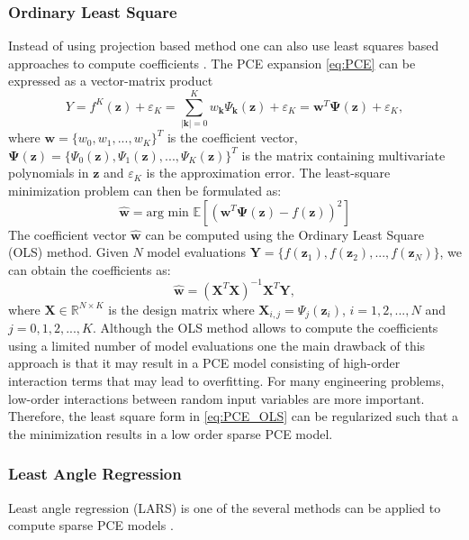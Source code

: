 \documentclass[review]{elsarticle}
\numberwithin{equation}{section}
\numberwithin{equation}{section}
\begin{document}
\subsubsection{Ordinary Least Square}
Instead of using projection based method one can also use least squares based approaches to compute coefficients \cite{Berveiller2006}. The PCE expansion \eqref{eq:PCE} can be expressed as a vector-matrix product
\begin{equation}\label{eq:LSM}
Y = f^{K}(\mathbf{z}) +\varepsilon_K = \sum_{|\mathbf{k}| = 0}^K w_{\mathbf{k}}\Psi_{\mathbf{k}}(\mathbf{z}) + \varepsilon_K = \mathbf{w}^T\boldsymbol{\Psi}(\mathbf{z}) +\varepsilon_K,
\end{equation} 
where $\mathbf{w} = \{w_0,w_1,...,w_K\}^T$ is the coefficient vector, $\boldsymbol{\Psi}(\mathbf{z}) = \{\Psi_0(\mathbf{z}), \Psi_1(\mathbf{z}), ..., \Psi_K(\mathbf{z})\}^T$ is the matrix containing multivariate polynomials in $\mathbf{z}$ and $\varepsilon_K$ is the approximation error. The least-square minimization problem can then be formulated as:
\begin{equation}\label{eq:PCE_OLS}
\mathbf{\hat{w}} = \text{arg min }\mathbb{E}\left[\left(\mathbf{w}^T \boldsymbol{\Psi}(\mathbf{z}) - f(\mathbf{z})\right)^2\right]
 \end{equation}
The coefficient vector $\mathbf{\hat{w}}$ can be computed using the Ordinary Least Square (OLS) method. Given $N$ model evaluations $\mathbf{Y} = \{f(\mathbf{z}_1), f(\mathbf{z}_2), ..., f(\mathbf{z}_N)\}$, we can obtain the coefficients as:
\begin{equation}\label{eq:OLS}
\hat{\mathbf{w}} = (\mathbf{X}^T\mathbf{X})^{-1}\mathbf{X}^T\mathbf{Y},
\end{equation}
where $\mathbf{X}\in \mathbb{R}^{N\times K}$ is the design matrix where $\mathbf{X}_{i,j} = \Psi_{j}(\mathbf{z}_i)$, $i = 1,2, ..., N$ and $j = 0,1,2,..., K$. Although the OLS method allows to compute the coefficients using a limited number of model evaluations one the main drawback of this approach is that it may result in a PCE model consisting of high-order interaction terms that may lead to overfitting. For many engineering problems, low-order interactions between random input variables are more important. Therefore, the least square form in \eqref{eq:PCE_OLS} can be regularized such that a the minimization results in a low order sparse PCE model.

\subsubsection{Least Angle Regression}
Least angle regression (LARS) is one of the several methods can be applied to compute sparse PCE models \cite{BlatmanThesis,BLATMAN2011}.
\end{document}
